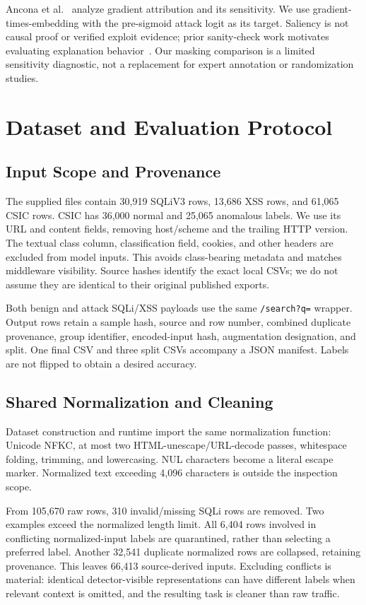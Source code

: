 \documentclass[conference]{IEEEtran}
\begin{document}
Ancona et al.~\cite{ancona} analyze gradient attribution and its sensitivity. We use gradient-times-embedding with the pre-sigmoid attack logit as its target. Saliency is not causal proof or verified exploit evidence; prior sanity-check work motivates evaluating explanation behavior~\cite{sanity}. Our masking comparison is a limited sensitivity diagnostic, not a replacement for expert annotation or randomization studies.

\section{Dataset and Evaluation Protocol}
\subsection{Input Scope and Provenance}
The supplied files contain 30,919 SQLiV3 rows, 13,686 XSS rows, and 61,065 CSIC rows. CSIC has 36,000 normal and 25,065 anomalous labels. We use its URL and content fields, removing host/scheme and the trailing HTTP version. The textual class column, classification field, cookies, and other headers are excluded from model inputs. This avoids class-bearing metadata and matches middleware visibility. Source hashes identify the exact local CSVs; we do not assume they are identical to their original published exports.

Both benign and attack SQLi/XSS payloads use the same \texttt{/search?q=} wrapper. Output rows retain a sample hash, source and row number, combined duplicate provenance, group identifier, encoded-input hash, augmentation designation, and split. One final CSV and three split CSVs accompany a JSON manifest. Labels are not flipped to obtain a desired accuracy.

\subsection{Shared Normalization and Cleaning}
Dataset construction and runtime import the same normalization function: Unicode NFKC, at most two HTML-unescape/URL-decode passes, whitespace folding, trimming, and lowercasing. NUL characters become a literal escape marker. Normalized text exceeding 4,096 characters is outside the inspection scope.

From 105,670 raw rows, 310 invalid/missing SQLi rows are removed. Two examples exceed the normalized length limit. All 6,404 rows involved in conflicting normalized-input labels are quarantined, rather than selecting a preferred label. Another 32,541 duplicate normalized rows are collapsed, retaining provenance. This leaves 66,413 source-derived inputs. Excluding conflicts is material: identical detector-visible representations can have different labels when relevant context is omitted, and the resulting task is cleaner than raw traffic.
\end{document}
